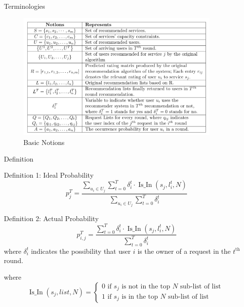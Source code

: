 \begin{frame}{Terminologies}%

\begin{figure}
    \centering
    \includegraphics[width=0.9\textwidth]{img/notion.png}
    \caption{Basic Notions}
    \label{notion}
\end{figure}
   
\end{frame}


\begin{frame}{Definition}%
\begin{block}{Definition 1: Ideal Probability}
\begin{equation}
p_{j}^{T}=\frac{\sum_{u_{i} \in U_{j}} \sum_{t=0}^{T} \delta_{i}^{t} \cdot  \operatorname{Is\_In}\left(s_{j}, l_{i}^{t}, N\right)}{\sum_{u_{i} \in U_{j}} \sum_{t=0}^{T} \delta_{i}^{t}}
\end{equation}
\end{block}
\begin{block}{Definition 2: Actual Probability} 
\begin{equation}
p_{i, j}^{T}=\frac{\sum_{t=0}^{T} \delta_{i}^{t} \cdot \operatorname{Is\_In}\left(s_{j}, l_{i}^{t}, N\right)}{\sum_{t=0}^{T} \delta_{i}^{t}}
\end{equation}
where $\delta_{i}^{t}$ indicates the possibility that user $i$ is the owner of a request in the $t^{\text{th}}$ round.
\end{block}
where
\begin{equation}\operatorname{Is\_In}\left(s_{j}, l i s t, N\right)=\left\{\begin{array}{l}0 \text { if } s_{j} \text { is not in the top } N \text { sub-list of list } \\ 1 \text { if } s_{j} \text { is in the top } N \text { sub-list of list }\end{array}\right.\end{equation}
\end{frame}

